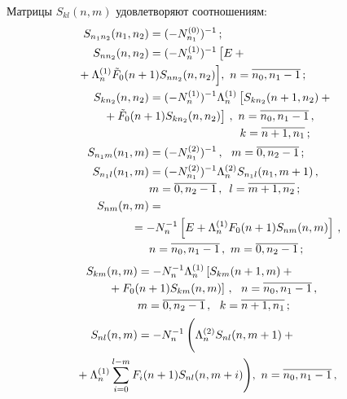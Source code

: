 \begin{multicols}{2}
Матрицы $S_{kl}(n,m)$ удовлетворяют соотношениям:
\begin{align}
\label{2m1}
S_{n_1n_2}(n_1,n_2) &=
(-N^{(0)}_{n_1})^{-1}\,;
\\
S_{nn_2}(n,n_2) &=
(-N^{(1)}_{n})^{-1}
\left[\vphantom{\tilde F_0(n+1)}
E +{}\right.\notag\\
&\hspace*{-23mm}\left.{}+ \Lambda^{(1)}_{n} \tilde F_0(n+1) S_{nn_2}(n,n_2)
\right]\!,
\ n=\overline{n_0,n_1-1}\,;\!\label{2m2}\\
S_{kn_2}(n,n_2) &=
(-N^{(1)}_{n})^{-1} \Lambda^{(1)}_{n}
\left[\vphantom{\tilde F_0(n+1)}
S_{kn_2}(n+1,n_2) +{}\notag\right.\\
&\hspace*{-15mm}\left.{}+ \tilde F_0(n+1) S_{kn_2}(n,n_2)
\right]\,,
 \ n=\overline{n_0,n_1-1}\,,\notag\\
& \hspace*{28mm} k=\overline{n+1,n_1}\,;
 \label{2m3}\\
 S_{n_1m}(n_1,m) &=
(-N^{(2)}_{n_1})^{-1}\,,
\ \ m=\overline{0,n_2-1}\,;
\label{2m4}\\
\label{2m5}
S_{n_1l}(n_1,m) & =
(-N^{(2)}_{n_1})^{-1} \Lambda^{(2)}_{n} S_{n_1l}(n_1,m+1)\,,\notag\\
& m=\overline{0,n_2-1}\,,
\enskip l=\overline{m+1,n_2}\,;\\
\label{2m6}
S_{nm}(n,m) &=\notag\\
&\hspace*{-5.5mm}{}=-N_{n}^{-1} 
\left[
E + \Lambda^{(1)}_{n} F_0(n+1) S_{nm}(n,m)
\right]\,,\notag\\
&  n=\overline{n_0,n_1-1}\,,\ m=\overline{0,n_2-1}\,;
\end{align}
\begin{align}
\label{2m7}
S_{km}(n,m) & =
-N_{n}^{-1} \Lambda^{(1)}_{n}
\left[
S_{km}(n+1,m) +{}\right.\notag\\
&\hspace*{-10mm}\left.{}+ F_0(n+1) S_{km}(n,m)
\right]
\,,
\ \ n=\overline{n_0,n_1-1}\,,\notag\\
&m=\overline{0,n_2-1}\,,
\ \ k=\overline{n+1,n_1}\,;
\\
\label{2m8}
S_{nl}(n,m) &=
-N_{n}^{-1} 
\left(\vphantom{\sum\limits_{i=0}^{l-m}}
\Lambda^{(2)}_{n} S_{nl}(n,m+1) +{}\right.\notag\\
&\hspace*{-20mm}\left.{}+ \Lambda^{(1)}_{n} \sum_{i=0}^{l-m} F_i(n+1) S_{nl}(n,m+i)
\right)\!,\ n=\overline{n_0,n_1-1}\,,\notag\\

\end{align}
\end{multicols}
